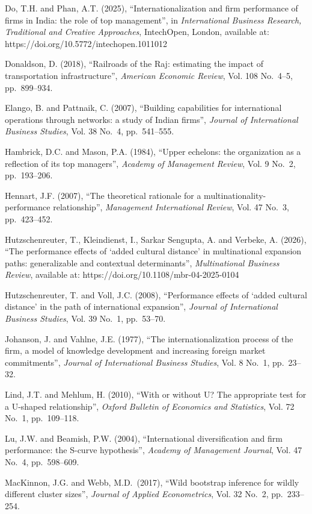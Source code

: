 \documentclass[
  12pt]{article}
\begin{document}
Do, T.H. and Phan, A.T. (2025), ``Internationalization and firm
performance of firms in India: the role of top management'', in
\emph{International Business Research, Traditional and Creative
Approaches}, IntechOpen, London, available at:
https://doi.org/10.5772/intechopen.1011012

Donaldson, D. (2018), ``Railroads of the Raj: estimating the impact of
transportation infrastructure'', \emph{American Economic Review}, Vol.
108 No.~4--5, pp.~899--934.

Elango, B. and Pattnaik, C. (2007), ``Building capabilities for
international operations through networks: a study of Indian firms'',
\emph{Journal of International Business Studies}, Vol. 38 No.~4,
pp.~541--555.

Hambrick, D.C. and Mason, P.A. (1984), ``Upper echelons: the
organization as a reflection of its top managers'', \emph{Academy of
Management Review}, Vol. 9 No.~2, pp.~193--206.

Hennart, J.F. (2007), ``The theoretical rationale for a
multinationality-performance relationship'', \emph{Management
International Review}, Vol. 47 No.~3, pp.~423--452.

Hutzschenreuter, T., Kleindienst, I., Sarkar Sengupta, A. and Verbeke,
A. (2026), ``The performance effects of `added cultural distance' in
multinational expansion paths: generalizable and contextual
determinants'', \emph{Multinational Business Review}, available at:
https://doi.org/10.1108/mbr-04-2025-0104

Hutzschenreuter, T. and Voll, J.C. (2008), ``Performance effects of
`added cultural distance' in the path of international expansion'',
\emph{Journal of International Business Studies}, Vol. 39 No.~1,
pp.~53--70.

Johanson, J. and Vahlne, J.E. (1977), ``The internationalization process
of the firm, a model of knowledge development and increasing foreign
market commitments'', \emph{Journal of International Business Studies},
Vol. 8 No.~1, pp.~23--32.

Lind, J.T. and Mehlum, H. (2010), ``With or without U? The appropriate
test for a U-shaped relationship'', \emph{Oxford Bulletin of Economics
and Statistics}, Vol. 72 No.~1, pp.~109--118.

Lu, J.W. and Beamish, P.W. (2004), ``International diversification and
firm performance: the S-curve hypothesis'', \emph{Academy of Management
Journal}, Vol. 47 No.~4, pp.~598--609.

MacKinnon, J.G. and Webb, M.D.~(2017), ``Wild bootstrap inference for
wildly different cluster sizes'', \emph{Journal of Applied
Econometrics}, Vol. 32 No.~2, pp.~233--254.
\end{document}
